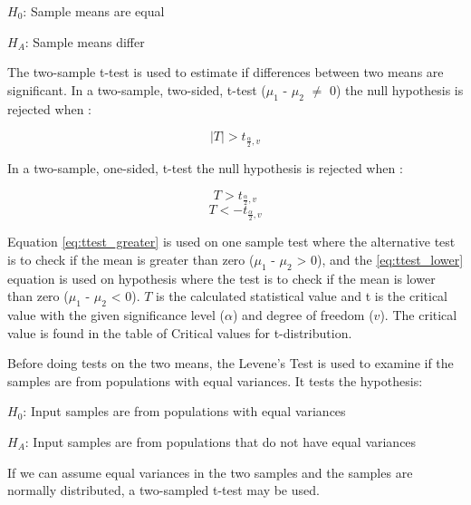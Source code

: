 \centerline{$H_{0}$: Sample means are equal} 
\centerline{$H_{A}$: Sample means differ}

The two-sample t-test is used to estimate if differences between two means are significant. In a two-sample, two-sided, t-test ($\mu_{1}$ - $\mu_{2}$ $\neq$ 0) the null hypothesis is rejected when \citep[p.~345]{Walpole2012}:

\begin{equation}
\label{eq:ttest_twoway}
|T| > t_{\frac{\alpha}{2}, v} 
\end{equation}

In a two-sample, one-sided, t-test the null hypothesis is rejected when \cite[p.~350]{Walpole2012}:

\begin{equation}
\label{eq:ttest_greater}
T > t_{\frac{\alpha}{2}, v}
\end{equation}
\begin{equation}
\label{eq:ttest_lower}
T < - t_{\frac{\alpha}{2}, v}
\end{equation}

Equation \ref{eq:ttest_greater} is used on one sample test where the alternative test is to check if the mean is greater than zero ($\mu_{1}$ - $\mu_{2}$ > 0), and the \ref{eq:ttest_lower} equation is used on hypothesis where the test is to check if the mean is lower than zero ($\mu_{1}$ - $\mu_{2}$ < 0). $T$ is the calculated statistical value and t is the critical value with the given significance level ($\alpha$) and degree of freedom ($v$). The critical value is found in the table of Critical values for t-distribution. \newline 
 
Before doing tests on the two means, the Levene's Test is used to examine if the samples are from populations with equal variances. It tests the hypothesis:\newline %

\centerline{$H_{0}$: Input samples are from populations with equal variances} 
\centerline{$H_{A}$: Input samples are from populations that do not have equal variances}
\vspace{0.2cm}
If we can assume equal variances in the two samples and the samples are normally distributed, a two-sampled t-test may be used. 

